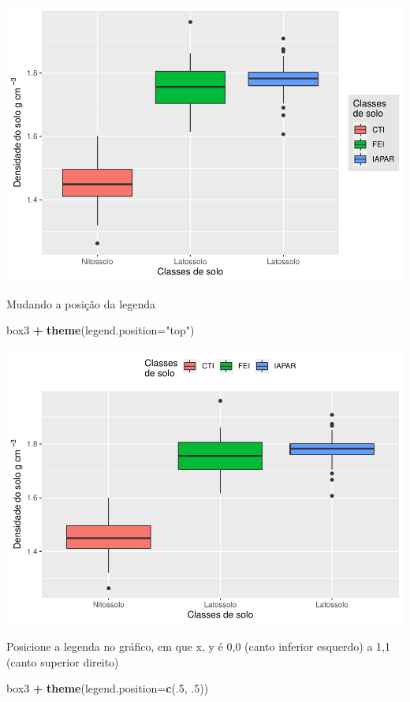 \documentclass[
]{book}
\newenvironment{Shaded}{\begin{snugshade}}{\end{snugshade}}
\newcommand{\DataTypeTok}[1]{\textcolor[rgb]{0.13,0.29,0.53}{#1}}
\newcommand{\DecValTok}[1]{\textcolor[rgb]{0.00,0.00,0.81}{#1}}
\newcommand{\FloatTok}[1]{\textcolor[rgb]{0.00,0.00,0.81}{#1}}
\newcommand{\KeywordTok}[1]{\textcolor[rgb]{0.13,0.29,0.53}{\textbf{#1}}}
\newcommand{\NormalTok}[1]{#1}
\newcommand{\OperatorTok}[1]{\textcolor[rgb]{0.81,0.36,0.00}{\textbf{#1}}}
\newcommand{\StringTok}[1]{\textcolor[rgb]{0.31,0.60,0.02}{#1}}
\begin{document}
\includegraphics{TudodoR_files/figure-latex/unnamed-chunk-214-2.pdf}

Mudando a posição da legenda

\begin{Shaded}
\begin{Highlighting}[]
\NormalTok{box3 }\OperatorTok{+}\StringTok{ }\KeywordTok{theme}\NormalTok{(}\DataTypeTok{legend.position=}\StringTok{"top"}\NormalTok{)}
\end{Highlighting}
\end{Shaded}

\includegraphics{TudodoR_files/figure-latex/unnamed-chunk-215-1.pdf}

Posicione a legenda no gráfico, em que x, y é 0,0 (canto inferior esquerdo) a 1,1 (canto superior direito)

\begin{Shaded}
\begin{Highlighting}[]
\NormalTok{box3 }\OperatorTok{+}\StringTok{ }\KeywordTok{theme}\NormalTok{(}\DataTypeTok{legend.position=}\KeywordTok{c}\NormalTok{(.}\DecValTok{5}\NormalTok{, }\FloatTok{.5}\NormalTok{))}
\end{Highlighting}
\end{Shaded}
\end{document}
